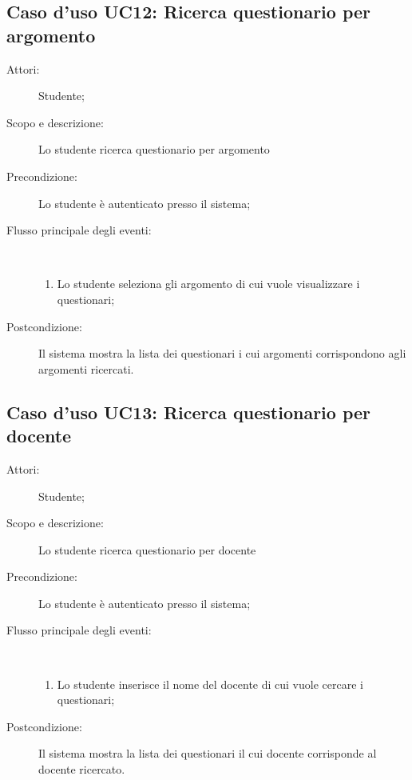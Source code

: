 \subsection{Caso d'uso UC12: Ricerca questionario per argomento}\begin{description}
	\item[Attori:] Studente;
	\item[Scopo e descrizione:] Lo studente ricerca questionario per argomento
	\item[Precondizione:] Lo studente è autenticato presso il sistema;
	
	\item[Flusso principale degli eventi:] \ 
	\begin{enumerate}
		\item Lo studente seleziona gli argomento di cui vuole visualizzare i questionari;
		
	\end{enumerate}
	\item[Postcondizione:] Il sistema mostra la lista dei questionari i cui argomenti corrispondono agli argomenti ricercati.
\end{description}
\hypertarget{UC13}{}
\subsection{Caso d'uso UC13: Ricerca questionario per docente}\begin{description}
	\item[Attori:] Studente;
	\item[Scopo e descrizione:] Lo studente ricerca questionario per docente
	\item[Precondizione:] Lo studente è autenticato presso il sistema;
	
	\item[Flusso principale degli eventi:] \ 
	\begin{enumerate}
		\item Lo studente inserisce il nome del docente di cui vuole cercare i questionari;
		
	\end{enumerate}
	\item[Postcondizione:] Il sistema mostra la lista dei questionari il cui docente corrisponde al docente ricercato.
\end{description}
\hypertarget{UC14}{}
